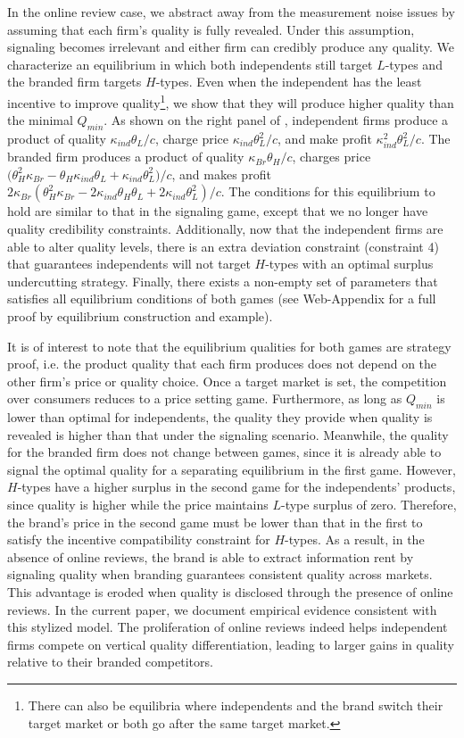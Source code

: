 \documentclass[mksc,blindrev]{informs3} %
\begin{document}
In the online review case, we abstract away from the measurement noise issues by assuming that each firm’s quality is fully revealed. Under this assumption, signaling becomes irrelevant and either firm can credibly produce any quality. We characterize an equilibrium in which both independents still target $L$-types and the branded firm targets $H$-types. Even when the independent has the least incentive to improve quality\footnote{There can also be equilibria where independents and the brand switch their target market or both go after the same target market.}, we show that they will produce higher quality than the minimal $Q_{min}$. As shown on the right panel of , independent firms produce a product of quality $\kappa_{ind}\theta_L/c$, charge price $\kappa_{ind}\theta_L^2/c$, and make profit $\kappa_{ind}^2\theta_L^2/c$. The branded firm produces a product of quality $\kappa_{Br}\theta_H/c$, charges price $\big(\theta_H^2 \kappa_{Br}-\theta_H \kappa_{ind} \theta_L+\kappa_{ind} \theta_L^2\big)/c$, and makes profit $2 \kappa_{Br} (\theta_H^2 \kappa_{Br}-2 \kappa_{ind} \theta_H \theta_L+2 \kappa_{ind} \theta_L^2)/c$. The conditions for this equilibrium to hold are similar to that in the signaling game, except that we no longer have quality credibility constraints. Additionally, now that the independent firms are able to alter quality levels, there is an extra deviation constraint (constraint 4) that guarantees independents will not target $H$-types with an optimal surplus undercutting strategy. Finally, there exists a non-empty set of parameters that satisfies all equilibrium conditions of both games (see Web-Appendix for a full proof by equilibrium construction and example).

It is of interest to note that the equilibrium qualities for both games are strategy proof, i.e. the product quality that each firm produces does not depend on the other firm's price or quality choice. Once a target market is set, the competition over consumers reduces to a price setting game. Furthermore, as long as $Q_{min}$ is lower than optimal for independents, the quality they provide when quality is revealed is higher than that under the signaling scenario. Meanwhile, the quality for the branded firm does not change between games, since it is already able to signal the optimal quality for a separating equilibrium in the first game. However, $H$-types have a higher surplus in the second game for the independents' products, since quality is higher while the price maintains $L$-type surplus of zero. Therefore, the brand's price in the second game must be lower than that in the first to satisfy the incentive compatibility constraint for $H$-types. As a result, in the absence of online reviews, the brand is able to extract information rent by signaling quality when branding guarantees consistent quality across markets. This advantage is eroded when quality is disclosed through the presence of online reviews. In the current paper, we document empirical evidence consistent with this stylized model. The proliferation of online reviews indeed helps independent firms compete on vertical quality differentiation, leading to larger gains in quality relative to their branded competitors.
\end{document}
